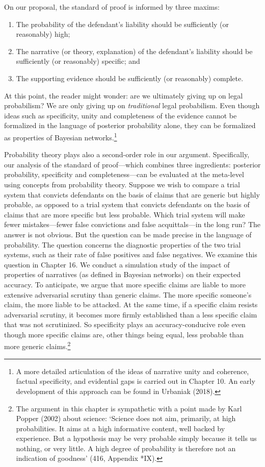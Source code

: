 \documentclass[
  10pt,
  dvipsnames,enabledeprecatedfontcommands]{scrartcl}
\begin{document}
On our proposal, the standard of proof is informed by three maxims:

\begin{enumerate}
\def\labelenumi{\arabic{enumi}.}
\item
  The probability of the defendant's liability should be sufficiently
  (or reasonably) high;
\item
  The narrative (or theory, explanation) of the defendant's liability
  should be sufficiently (or reasonably) specific; and
\item
  The supporting evidence should be sufficiently (or reasonably)
  complete.
\end{enumerate}

\noindent  At this point, the reader might wonder: are we ultimately
giving up on legal probabilism? We are only giving up on
\emph{traditional} legal probabilism. Even though ideas such as
specificity, unity and completeness of the evidence cannot be formalized
in the language of posterior probability alone, they can be formalized
as properties of Bayesian networks.\footnote{A more detailed
  articulation of the ideas of narrative unity and coherence, factual
  specificity, and evidential gaps is carried out in Chapter 10. An
  early development of this approach can be found in Urbaniak (2018).}

Probability theory plays also a second-order role in our argument.
Specifically, our analysis of the standard of proof---which combines
three ingredients: posterior probability, specificity and
completeness---can be evaluated at the meta-level using concepts from
probability theory. Suppose we wish to compare a trial system that
convicts defendants on the basis of claims that are generic but highly
probable, as opposed to a trial system that convicts defendants on the
basis of claims that are more specific but less probable. Which trial
system will make fewer mistakes---fewer false convictions and false
acquittals---in the long run? The answer is not obvious. But the
question can be made precise in the language of probability. The
question concerns the diagnostic properties of the two trial systems,
such as their rate of false positives and false negatives. We examine
this question in Chapter 16. We conduct a simulation study of the impact
of properties of narratives (as defined in Bayesian networks) on their
expected accuracy. To anticipate, we argue that more specific claims are
liable to more extensive adversarial scrutiny than generic claims. The
more specific someone's claim, the more liable to be attacked. At the
same time, if a specific claim resists adversarial scrutiny, it becomes
more firmly established than a less specific claim that was not
scrutinized. So specificity plays an accuracy-conducive role even though
more specific claims are, other things being equal, less probable than
more generic claims.\footnote{The argument in this chapter is
  sympathetic with a point made by Karl Popper (2002) about science:
  `Science does not aim, primarily, at high probabilities. It aims at a
  high informative content, well backed by experience. But a hypothesis
  may be very probable simply because it tells us nothing, or very
  little. A high degree of probability is therefore not an indication of
  goodness' (416, Appendix *IX).}
\end{document}
